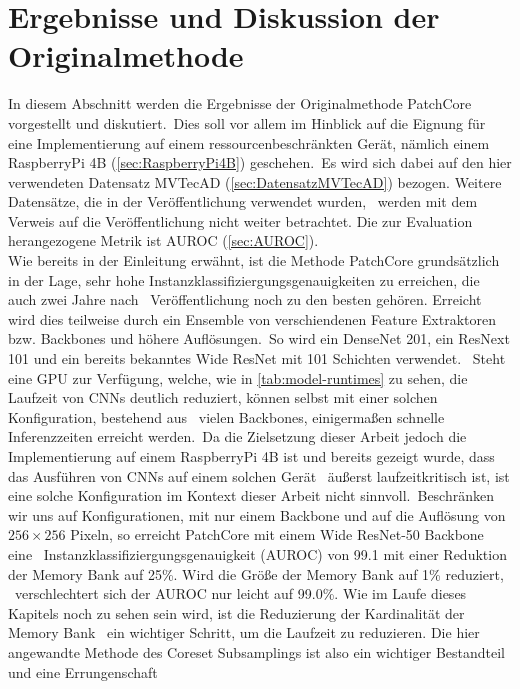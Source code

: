 \section{Ergebnisse und Diskussion der Originalmethode}\label{sec:ErgebnisseUndDiskussionDerOriginalmethode}
In diesem Abschnitt werden die Ergebnisse der Originalmethode PatchCore vorgestellt und diskutiert.\
Dies soll vor allem im Hinblick auf die Eignung für eine Implementierung auf einem ressourcenbeschränkten Gerät, nämlich einem RaspberryPi 4B (\ref{sec:RaspberryPi4B}) geschehen.\
Es wird sich dabei auf den hier verwendeten Datensatz MVTecAD (\ref{sec:DatensatzMVTecAD}) bezogen. Weitere Datensätze, die in der Veröffentlichung verwendet wurden, \
werden mit dem Verweis auf die Veröffentlichung nicht weiter betrachtet. Die zur Evaluation herangezogene Metrik ist AUROC (\ref{sec:AUROC}).\\
Wie bereits in der Einleitung erwähnt, ist die Methode PatchCore grundsätzlich in der Lage, sehr hohe Instanzklassifiziergungsgenauigkeiten zu erreichen, die auch zwei Jahre nach \
Veröffentlichung noch zu den besten gehören. Erreicht wird dies teilweise durch ein Ensemble von verschiendenen Feature Extraktoren bzw. Backbones und höhere Auflösungen.\
So wird ein \glqq DenseNet 201\grqq{}\cite{densenet}, ein \glqq ResNext 101\grqq{}\cite{resnext} und ein bereits bekanntes Wide ResNet mit 101 Schichten\cite{wideresnet} verwendet. \
Steht eine GPU zur Verfügung, welche, wie in \ref{tab:model-runtimes} zu sehen, die Laufzeit von CNNs deutlich reduziert, können selbst mit einer solchen Konfiguration, bestehend aus \
vielen Backbones, einigermaßen schnelle Inferenzzeiten erreicht werden.\
Da die Zielsetzung dieser Arbeit jedoch die Implementierung auf einem RaspberryPi 4B ist und bereits gezeigt wurde, dass das Ausführen von CNNs auf einem solchen Gerät \
äußerst laufzeitkritisch ist, ist eine solche Konfiguration im Kontext dieser Arbeit nicht sinnvoll.\
Beschränken wir uns auf Konfigurationen, mit nur einem Backbone und auf die Auflösung von $256\times 256$ Pixeln, so erreicht PatchCore mit einem Wide ResNet-50 Backbone eine \
Instanzklassifiziergungsgenauigkeit (AUROC) von \num{99,1} mit einer Reduktion der Memory Bank auf \num{25}\%. Wird die Größe der Memory Bank auf \num{1}\% reduziert, \
verschlechtert sich der AUROC nur leicht auf \num{99,0}\%. Wie im Laufe dieses Kapitels noch zu sehen sein wird, ist die Reduzierung der Kardinalität der Memory Bank \
ein wichtiger Schritt, um die Laufzeit zu reduzieren. Die hier angewandte Methode des Coreset Subsamplings ist also ein wichtiger Bestandteil und eine Errungenschaft \ 
